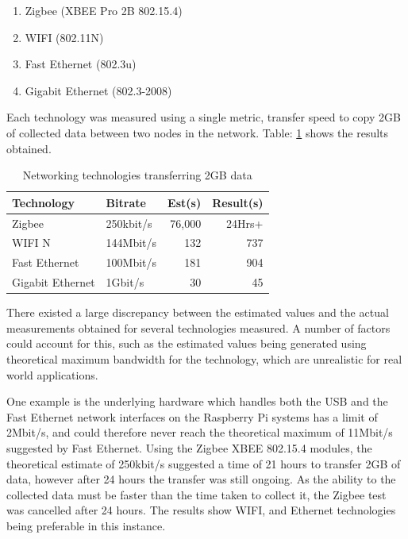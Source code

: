 \documentclass[runningheads,a4paper]{llncs}
\begin{document}
\begin{enumerate}
	\item Zigbee (XBEE Pro 2B 802.15.4)
	\item WIFI (802.11N)
	\item Fast Ethernet (802.3u)
	\item Gigabit Ethernet (802.3-2008)
\end{enumerate}

Each technology was measured using a single metric, transfer speed to copy 2GB of collected data between two nodes in the network. Table: \ref{tab:network_technologies_transfer_time} shows the results obtained. 

%
\begin{table}
	\centering
	\begin{tabular}{p{3cm} l r r }
		\toprule
		Technology & Bitrate & Est(s) & Result(s)\\ \midrule
		Zigbee & 250kbit/s &  76,000 & 24Hrs+ \\
		WIFI N & 144Mbit/s & 132 & 737\\
		Fast Ethernet & 100Mbit/s & 181 & 904 \\
		Gigabit Ethernet & 1Gbit/s & 30 & 45 \\
		\bottomrule
	\end{tabular}
	\caption{Networking technologies transferring 2GB data}
	\label{tab:network_technologies_transfer_time}
\end{table}
%

There existed a large discrepancy between the estimated values and the actual measurements obtained for several technologies measured. A number of factors could account for this, such as the estimated values being generated using theoretical maximum bandwidth for the technology, which are unrealistic for real world applications.

One example is the underlying hardware which handles both the USB and the Fast Ethernet network interfaces on the Raspberry Pi systems has a limit of 2Mbit/s, and could therefore never reach the theoretical maximum of 11Mbit/s suggested by Fast Ethernet. Using the Zigbee XBEE 802.15.4 modules, the theoretical estimate of 250kbit/s suggested a time of 21 hours to transfer 2GB of data, however after 24 hours the transfer was still ongoing. As the ability to the collected data must be faster than the time taken to collect it, the Zigbee test was cancelled after 24 hours. The results show WIFI, and Ethernet technologies being preferable in this instance.
\end{document}
